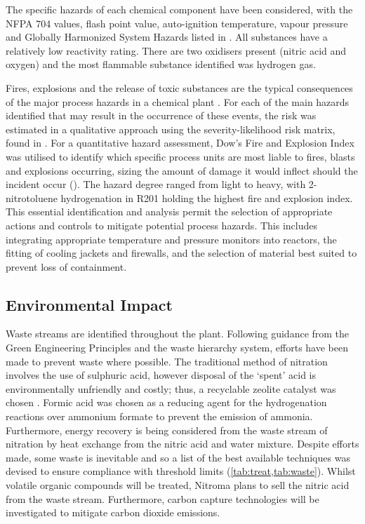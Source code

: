 The specific hazards of each chemical component have been considered, with the NFPA 704 values, flash point value, auto-ignition temperature, vapour pressure and Globally Harmonized System Hazards listed in . All substances have a relatively low reactivity rating. There are two oxidisers present (nitric acid and oxygen) and the most flammable substance identified was hydrogen gas.  

Fires, explosions and the release of toxic substances are the typical consequences of the major process hazards in a chemical plant \cite{mannan_lees_2012}. For each of the main hazards identified that may result in the occurrence of these events, the risk was estimated in a qualitative approach using the severity-likelihood risk matrix, found in . For a quantitative hazard assessment, Dow's Fire and Explosion Index was utilised to identify which specific process units are most liable to fires, blasts and explosions occurring, sizing the amount of damage it would inflect should the incident occur (). The hazard degree ranged from light to heavy, with 2-nitrotoluene hydrogenation in R201 holding the highest fire and explosion index. This essential identification and analysis permit the selection of appropriate actions and controls to mitigate potential process hazards. This includes integrating appropriate temperature and pressure monitors into reactors, the fitting of cooling jackets and firewalls, and the selection of material best suited to prevent loss of containment.


\subsection{Environmental Impact}
Waste streams are identified throughout the plant. Following guidance from the Green Engineering Principles and the waste hierarchy system, efforts have been made to prevent waste where possible. The traditional method of nitration involves the use of sulphuric acid, however disposal of the ‘spent’ acid is environmentally unfriendly and costly; thus, a recyclable zeolite catalyst was chosen \cite{smith_superior_1996}.  Formic acid was chosen as a reducing agent for the hydrogenation reactions over ammonium formate to prevent the emission of ammonia. Furthermore, energy recovery is being considered from the waste stream of nitration by heat exchange from the nitric acid and water mixture. 
Despite efforts made, some waste is inevitable and so a list of the best available techniques was devised to ensure compliance with threshold limits (\cref{tab:treat,tab:waste}). Whilst volatile organic compounds will be treated, Nitroma plans to sell the nitric acid from the waste stream. Furthermore, carbon capture technologies will be investigated to mitigate carbon dioxide emissions. 

